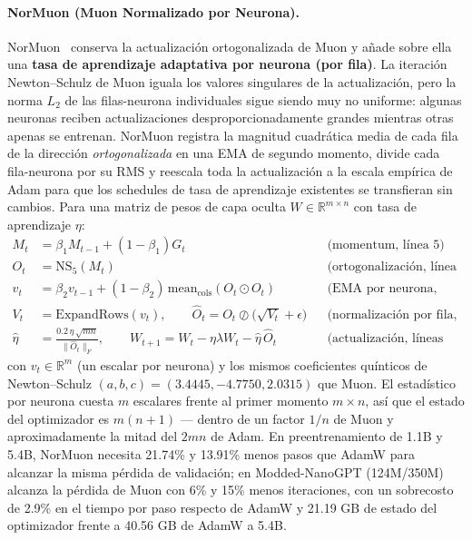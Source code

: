 \paragraph{NorMuon (Muon Normalizado por Neurona).}
NorMuon~\citep{li_normuon_2025} conserva la actualización ortogonalizada de Muon y añade
sobre ella una \textbf{tasa de aprendizaje adaptativa por neurona (por fila)}. La
iteración Newton--Schulz de Muon iguala los valores singulares de la actualización, pero
la norma $L_2$ de las filas-neurona individuales sigue siendo muy no uniforme: algunas
neuronas reciben actualizaciones desproporcionadamente grandes mientras otras apenas se
entrenan. NorMuon registra la magnitud cuadrática media de cada fila de la dirección
\emph{ortogonalizada} en una EMA de segundo momento, divide cada fila-neurona por su RMS
y reescala toda la actualización a la escala empírica de Adam para que los schedules de
tasa de aprendizaje existentes se transfieran sin cambios. Para una matriz de pesos de
capa oculta $W \in \mathbb{R}^{m \times n}$ con tasa de aprendizaje $\eta$:
\begin{align}
M_t &= \beta_1 M_{t-1} + (1-\beta_1) G_t && \text{(momentum, línea 5)} \\
O_t &= \mathrm{NS}_5(M_t) && \text{(ortogonalización, línea 6)} \\
v_t &= \beta_2 v_{t-1} + (1-\beta_2)\,\mathrm{mean}_{\mathrm{cols}}(O_t \odot O_t) && \text{(EMA por neurona, línea 7)} \\
V_t &= \mathrm{ExpandRows}(v_t), \qquad \widehat{O}_t = O_t \oslash \big(\sqrt{V_t} + \epsilon\big) && \text{(normalización por fila, líneas 8--9)} \\
\hat\eta &= \frac{0.2\,\eta\,\sqrt{mn}}{\lVert \widehat{O}_t \rVert_F}, \qquad
W_{t+1} = W_t - \eta\lambda W_t - \hat\eta\,\widehat{O}_t && \text{(actualización, líneas 10--11)}
\end{align}
con $v_t \in \mathbb{R}^m$ (un escalar por neurona) y los mismos coeficientes quínticos
de Newton--Schulz $(a,b,c)=(3.4445,-4.7750,2.0315)$ que Muon. El estadístico por neurona
cuesta $m$ escalares frente al primer momento $m \times n$, así que el estado del
optimizador es $m(n+1)$ --- dentro de un factor $1/n$ de Muon y aproximadamente la mitad
del $2mn$ de Adam. En preentrenamiento de 1.1B y 5.4B, NorMuon necesita 21.74\% y 13.91\%
menos pasos que AdamW para alcanzar la misma pérdida de validación; en Modded-NanoGPT
(124M/350M) alcanza la pérdida de Muon con 6\% y 15\% menos iteraciones, con un sobrecosto
de 2.9\% en el tiempo por paso respecto de AdamW y 21.19 GB de estado del optimizador
frente a 40.56 GB de AdamW a 5.4B.

